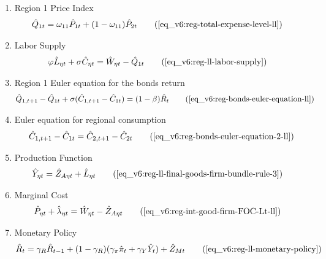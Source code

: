 \documentclass[../thesis.tex]{subfiles}
\begin{document}
{\begin{itemize}
\begin{enumerate}
		\item Region 1 Price Index
		\begin{align}
			\hat{Q}_{1t} &= \omega_{11} \hat{P}_{1 t} + (1 -\omega_{11}) \hat{P}_{2 t} \tag{\ref{eq_v6:reg-total-expense-level-ll}}
		\end{align}
		
		\begin{comment}
		\item Regional Terms of Trade
		\begin{align}
			\hat{Q}_{1t} &= \hat{Q}_{2t} \tag{\ref{eq_v6:reg-total-expense-level-2-ll}}
		\end{align}	
		\end{comment}
		
		
		
		\item Labor Supply
		\begin{alignat}{2}
			\varphi \hat{L}_{\eta t} + \sigma \hat{C}_{\eta t} &= \hat{W}_{\eta t} - \hat{Q}_{1t} \tag{\ref{eq_v6:reg-ll-labor-supply}}
		\end{alignat}
		
		\item Region 1 Euler equation for the bonds return
		\begin{align}
			\hat{Q}_{1, t+1} - \hat{Q}_{1t} + \sigma (\hat{C}_{1, t+1} - \hat{C}_{1t}) &= (1 - \beta) \hat{R}_{t} \tag{\ref{eq_v6:reg-bonds-euler-equation-ll}}
		\end{align}
		
		\item Euler equation for regional consumption
		\begin{align}
			\hat{C}_{1, t+1} - \hat{C}_{1t} = \hat{C}_{2, t+1} - \hat{C}_{2t} \tag{\ref{eq_v6:reg-bonds-euler-equation-2-ll}}
		\end{align}
		
		\item Production Function
		\begin{align}
			\hat{Y}_{\eta t} &= \hat{Z}_{A\eta t} + \hat{L}_{\eta t} \tag{\ref{eq_v6:reg-ll-final-goods-firm-bundle-rule-3}}
		\end{align}
		
		\item Marginal Cost
		\begin{align}
			\hat{P}_{\eta t} + \hat{\lambda}_{\eta t} &= \hat{W}_{\eta t} - \hat{Z}_{A\eta t} \tag{\ref{eq_v6:reg-int-good-firm-FOC-Lt-ll}}
		\end{align}
		
		\item Monetary Policy
		\begin{align}
			\hat{R}_t = \gamma_{R} \hat{R}_{t-1} + (1-\gamma_{R})(\gamma_{\pi} \hat{\pi}_t + \gamma_{Y} \hat{Y}_t) + \hat{Z}_{Mt} \tag{\ref{eq_v6:reg-ll-monetary-policy}}
		\end{align}
		

\end{enumerate}
\end{itemize}}
\end{document}

